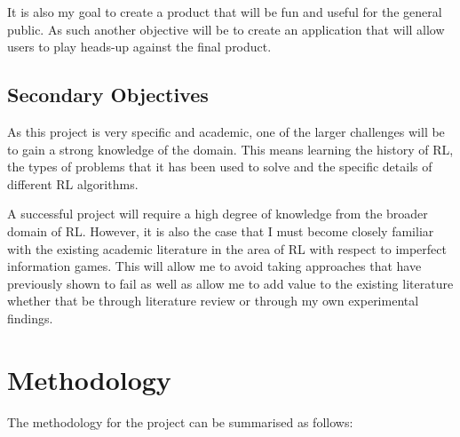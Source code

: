 It is also my goal to create a product that will be fun and useful for the general public.
As such another objective will be to create an application that will allow users to play heads-up against the final product.

\subsection{Secondary Objectives}\label{subsec:secondaryObjectives}
As this project is very specific and academic, one of the larger challenges will be to gain a strong knowledge
of the domain.
This means learning the history of RL, the types of problems that it has been used to solve and the specific details of
different RL algorithms.

A successful project will require a high degree of knowledge from the broader domain of RL. However, it is also the case
that I must become closely familiar with the existing academic literature in the area of RL with respect to imperfect
information games.
This will allow me to avoid taking approaches that have previously shown to fail as well as allow me to add value to
the existing literature whether that be through literature review or through my own experimental findings.


\section{Methodology}\label{sec:methodology}

The methodology for the project can be summarised as follows:

